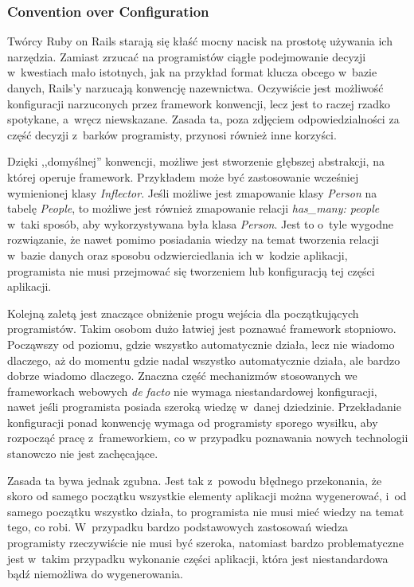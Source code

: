 \documentclass[mgr,oneside]{mgr}
\begin{document}
\subsubsection{Convention over Configuration}
Twórcy Ruby on Rails starają się kłaść mocny nacisk na prostotę używania ich narzędzia. Zamiast zrzucać na programistów ciągłe podejmowanie decyzji w~kwestiach mało istotnych, jak na przykład format klucza obcego w~bazie danych, Rails'y narzucają konwencję nazewnictwa. Oczywiście jest możliwość konfiguracji narzuconych przez framework konwencji, lecz jest to raczej rzadko spotykane, a~wręcz niewskazane. Zasada ta, poza zdjęciem odpowiedzialności za część decyzji z~barków programisty, przynosi również inne korzyści.

Dzięki ,,domyślnej'' konwencji, możliwe jest stworzenie głębszej abstrakcji, na której operuje framework. Przykładem może być zastosowanie wcześniej wymienionej klasy \emph{Inflector}. Jeśli możliwe jest zmapowanie klasy \emph{Person} na tabelę \emph{People}, to możliwe jest również zmapowanie relacji \emph{has\_many: people} w~taki sposób, aby wykorzystywana była klasa \textit{Person}. Jest to o~tyle wygodne rozwiązanie, że nawet pomimo posiadania wiedzy na temat tworzenia relacji w~bazie danych oraz sposobu odzwierciedlania ich w~kodzie aplikacji, programista nie musi przejmować się tworzeniem lub konfiguracją tej części aplikacji.

Kolejną zaletą jest znaczące obniżenie progu wejścia dla początkujących programistów. Takim osobom dużo łatwiej jest poznawać framework stopniowo. Począwszy od poziomu, gdzie wszystko automatycznie działa, lecz nie wiadomo dlaczego, aż do momentu gdzie nadal wszystko automatycznie działa, ale bardzo dobrze wiadomo dlaczego. Znaczna część mechanizmów stosowanych we frameworkach webowych \emph{de facto} nie wymaga niestandardowej konfiguracji, nawet jeśli programista posiada szeroką wiedzę w~danej dziedzinie. Przekładanie konfiguracji ponad konwencję wymaga od programisty sporego wysiłku, aby rozpocząć pracę z~frameworkiem, co w przypadku poznawania nowych technologii stanowczo nie jest zachęcające.

Zasada ta bywa jednak zgubna. Jest tak z~powodu błędnego przekonania, że skoro od samego początku wszystkie elementy aplikacji można wygenerować, i~od samego początku wszystko działa, to programista nie musi mieć wiedzy na temat tego, co robi. W~przypadku bardzo podstawowych zastosowań wiedza programisty rzeczywiście nie musi być szeroka, natomiast bardzo problematyczne jest w~takim przypadku wykonanie części aplikacji, która jest niestandardowa bądź niemożliwa do wygenerowania.
\end{document}
